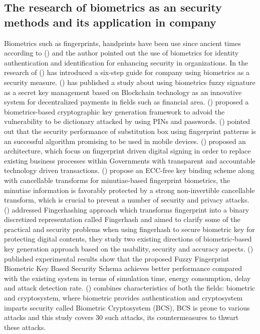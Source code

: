 \documentclass[graybox]{svmult}
\begin{document}
\subsection{The research of biometrics as an security methods and its application in company}
Biometrics such as fingerprints, handprints have been use since ancient times according to \citeauthor{gupta2008biometrics} (\citeyear{gupta2008biometrics}) and the author pointed out the use of biometrics for identity authentication and identification for enhancing security in organizations.
In the research of \citeauthor{bidgoli2012introduction}(\citeyear{bidgoli2012introduction}) has introduced a six-step guide for company using biometrics as a security measure.
\citeauthor{naganuma2020new} (\citeyear{naganuma2020new}) has published a study about using biometrics fuzzy signature as a secret key management based on Blockchain technology as an innovative system for decentralized payments in fields such as financial area.
\citeauthor{chang2004biometrics} (\citeyear{chang2004biometrics}) proposed a biometrics-based cryptographic key generation framework to advoid the vulnerability to be dictionary attacked by using PINs and passwords.
\citeauthor{sengel2020efficient} (\citeyear{sengel2020efficient}) pointed out that the security performance of substitution box using fingerprint patterns is an successful algorithm promising to be used in mobile devices.
\citeauthor{dhir2019uidba} (\citeyear{dhir2019uidba}) proposed an architecture, which focus on fingerprint driven digital signing in order to replace existing business processes within Governments with transparent and accountable technology driven transactions.
\citeauthor{jin2016biometric} (\citeyear{jin2016biometric}) propose an ECC-free key binding scheme along with cancellable transforms for minutiae-based fingerprint biometrics, the minutiae information is favorably protected by a strong non-invertible cancellable transform, which is crucial to prevent a number of security and privacy attacks.
\citeauthor{song2007personalized} (\citeyear{song2007personalized}) addressed Fingerhashing approach which transforms fingerprint into a binary discretized representation called Fingerhash and aimed to clarify some of the practical and security problems when using fingerhash to secure biometric key for protecting digital contents, they study two existing directions of biometric‐based key generation approach based on the usability, security and accuracy aspects.
\citeauthor{nivedetha2020ffbks} (\citeyear{nivedetha2020ffbks}) published  experimental results show that the proposed Fuzzy Fingerprint Biometric Key Based Security Schema achieves better performance compared with the existing system in terms of simulation time, energy consumption, delay and attack detection rate.
\citeauthor{kaur2023biometric} (\citeyear{kaur2023biometric}) combines characteristics of both the fields: biometric and cryptosystem, where biometric provides authentication and cryptosystem imparts security called Biometric Cryptosystem (BCS), BCS is prone to various attacks and this study covers 30 such attacks, its countermeasures to thwart these attacks.
\\[6pt]
\end{document}
